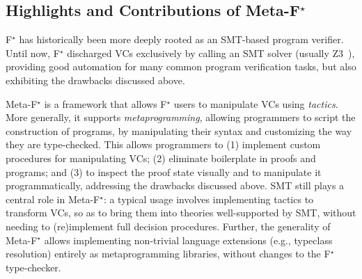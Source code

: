 \documentclass[runningheads]{llncs}
\newcommand\fstar{F$^\star$\xspace}
\newcommand\metafstar{Meta-F$^\star$\xspace}
\newcommand{\comm}[3]{\ifcheckpagebudget\else\ifdraft{{\color{#1}[#2: #3]}}\fi\fi}
\newcommand{\ch}[1]{\comm{teal}{CH}{#1}}
\newcommand{\guido}[1]{\comm{blue}{Guido}{#1}}
\newcommand{\da}[1]{\comm{dkyellow}{Danel}{#1}}
\begin{document}
\subsection*{Highlights and Contributions of \metafstar}

\fstar has historically been more deeply rooted as an
SMT-based program verifier.
%
Until now, \fstar discharged VCs
exclusively by calling an SMT solver (usually Z3~\cite{MouraB08}), 
%
providing good automation for many common
program verification tasks, but
also exhibiting the drawbacks discussed above.



\metafstar is a framework that allows \fstar users to manipulate VCs
using \emph{tactics}. More generally, it
supports \emph{metaprogramming}, allowing programmers to script
the construction of programs, by manipulating their
syntax and customizing the way they are type-checked. This allows
programmers to (1) implement custom procedures for manipulating VCs;
(2) eliminate boilerplate in proofs and programs; and (3) to inspect
the proof state visually and to manipulate it programmatically,
addressing the drawbacks discussed above.
%
SMT still plays a central role in \metafstar: a typical usage involves
implementing tactics to transform VCs, so as to bring them into theories
well-supported by SMT, without needing to (re)implement full
decision procedures.
%
Further, the generality of \metafstar allows implementing non-trivial
language extensions (e.g., typeclass resolution) entirely as
metaprogramming libraries, without changes to the \fstar{}
type-checker.

\end{document}
